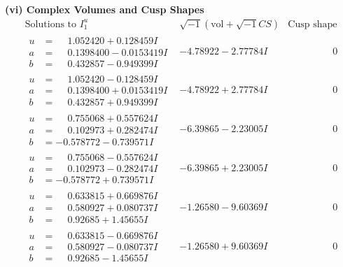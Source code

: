 \documentclass[1p]{elsarticle_modified}
\theoremstyle{definition}
\newcommand{\I}{\sqrt{-1}}
\begin{document}
\newpage\flushleft \textbf{(vi) Complex Volumes and Cusp Shapes}
$$\begin{array}{c|c|c}  
\text{Solutions to }I^u_{1}& \I (\text{vol} + \sqrt{-1}CS) & \text{Cusp shape}\\
 \hline 
\begin{aligned}
u &= \phantom{-}1.052420 + 0.128459 I \\
a &= \phantom{-}0.1398400 - 0.0153419 I \\
b &= \phantom{-}0.432857 - 0.949399 I\end{aligned}
 & -4.78922 - 2.77784 I & \phantom{-0.000000 } 0 \\ \hline\begin{aligned}
u &= \phantom{-}1.052420 - 0.128459 I \\
a &= \phantom{-}0.1398400 + 0.0153419 I \\
b &= \phantom{-}0.432857 + 0.949399 I\end{aligned}
 & -4.78922 + 2.77784 I & \phantom{-0.000000 } 0 \\ \hline\begin{aligned}
u &= \phantom{-}0.755068 + 0.557624 I \\
a &= \phantom{-}0.102973 + 0.282474 I \\
b &= -0.578772 - 0.739571 I\end{aligned}
 & -6.39865 - 2.23005 I & \phantom{-0.000000 } 0 \\ \hline\begin{aligned}
u &= \phantom{-}0.755068 - 0.557624 I \\
a &= \phantom{-}0.102973 - 0.282474 I \\
b &= -0.578772 + 0.739571 I\end{aligned}
 & -6.39865 + 2.23005 I & \phantom{-0.000000 } 0 \\ \hline\begin{aligned}
u &= \phantom{-}0.633815 + 0.669876 I \\
a &= \phantom{-}0.580927 + 0.080737 I \\
b &= \phantom{-}0.92685 + 1.45655 I\end{aligned}
 & -1.26580 - 9.60369 I & \phantom{-0.000000 } 0 \\ \hline\begin{aligned}
u &= \phantom{-}0.633815 - 0.669876 I \\
a &= \phantom{-}0.580927 - 0.080737 I \\
b &= \phantom{-}0.92685 - 1.45655 I\end{aligned}
 & -1.26580 + 9.60369 I & \phantom{-0.000000 } 0 \\ \hline\begin{aligned}

\end{aligned}
\end{array}$$
\end{document}
